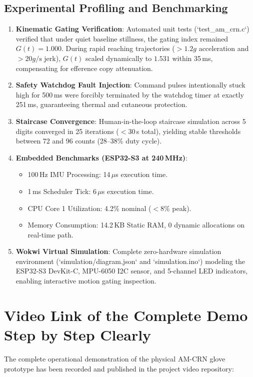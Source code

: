 \documentclass[10pt,twocolumn]{article}
\begin{document}
\subsection{Experimental Profiling and Benchmarking}
\begin{enumerate}
    \item \textbf{Kinematic Gating Verification}: Automated unit tests (`test\_am\_crn.c`) verified that under quiet baseline stillness, the gating index remained $G(t) = 1.000$. During rapid reaching trajectories ($>1.2g$ acceleration and $>20g/\text{s}$ jerk), $G(t)$ scaled dynamically to $1.531$ within 35\,ms, compensating for efference copy attenuation.
    \item \textbf{Safety Watchdog Fault Injection}: Command pulses intentionally stuck high for 500\,ms were forcibly terminated by the watchdog timer at exactly 251\,ms, guaranteeing thermal and cutaneous protection.
    \item \textbf{Staircase Convergence}: Human-in-the-loop staircase simulation across 5 digits converged in 25 iterations ($<30$\,s total), yielding stable thresholds between 72 and 96 counts (28--38\% duty cycle).
    \item \textbf{Embedded Benchmarks (ESP32-S3 at 240\,MHz)}:
    \begin{itemize}
        \item 100\,Hz IMU Processing: 14\,$\mu$s execution time.
        \item 1\,ms Scheduler Tick: 6\,$\mu$s execution time.
        \item CPU Core 1 Utilization: 4.2\% nominal ($<$8\% peak).
        \item Memory Consumption: 14.2\,KB Static RAM, 0 dynamic allocations on real-time path.
    \end{itemize}
    \item \textbf{Wokwi Virtual Simulation}: Complete zero-hardware simulation environment (`simulation/diagram.json` and `simulation.ino`) modeling the ESP32-S3 DevKit-C, MPU-6050 I2C sensor, and 5-channel LED indicators, enabling interactive motion gating inspection.
\end{enumerate}

\newpage
\section{Video Link of the Complete Demo Step by Step Clearly}
The complete operational demonstration of the physical AM-CRN glove prototype has been recorded and published in the project video repository:
\end{document}

